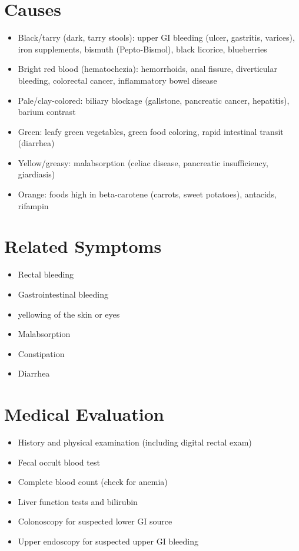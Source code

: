 \section*{Causes}
\begin{itemize}
\item Black/tarry (dark, tarry stools): upper GI bleeding (ulcer, gastritis, varices), iron supplements, bismuth (Pepto-Bismol), black licorice, blueberries
\item Bright red blood (hematochezia): hemorrhoids, anal fissure, diverticular bleeding, colorectal cancer, inflammatory bowel disease
\item Pale/clay-colored: biliary blockage (gallstone, pancreatic cancer, hepatitis), barium contrast
\item Green: leafy green vegetables, green food coloring, rapid intestinal transit (diarrhea)
\item Yellow/greasy: malabsorption (celiac disease, pancreatic insufficiency, giardiasis)
\item Orange: foods high in beta-carotene (carrots, sweet potatoes), antacids, rifampin
\end{itemize}

\section*{Related Symptoms}
\begin{itemize}
\item Rectal bleeding
\item Gastrointestinal bleeding
\item yellowing of the skin or eyes
\item Malabsorption
\item Constipation
\item Diarrhea
\end{itemize}

\section*{Medical Evaluation}
\begin{itemize}
\item History and physical examination (including digital rectal exam)
\item Fecal occult blood test
\item Complete blood count (check for anemia)
\item Liver function tests and bilirubin
\item Colonoscopy for suspected lower GI source
\item Upper endoscopy for suspected upper GI bleeding
\end{itemize}

